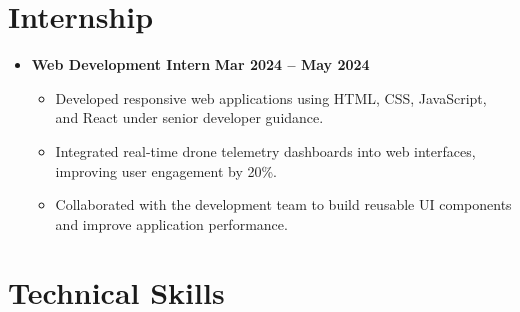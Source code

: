 \documentclass[letterpaper,11pt]{article}
\newcommand{\resumeItem}[1]{
\item\small{{#1 \vspace{-2pt}}}
}
\newcommand{\resumeSubHeadingListStart}{\begin{itemize}[leftmargin=0.0in,label={}]}
\newcommand{\resumeSubHeadingListEnd}{\end{itemize}}
\newcommand{\resumeItemListStart}{\begin{itemize}}
\newcommand{\resumeItemListEnd}{\end{itemize}\vspace{-5pt}}
\begin{document}
\section{Internship}

\resumeSubHeadingListStart

\item
\textbf{Web Development Intern}
\textbf{Mar 2024 -- May 2024}

\vspace{-8pt}

\resumeItemListStart

\resumeItem{Developed responsive web applications using HTML, CSS, JavaScript, and React under senior developer guidance.}

\resumeItem{Integrated real-time drone telemetry dashboards into web interfaces, improving user engagement by 20\%.}

\resumeItem{Collaborated with the development team to build reusable UI components and improve application performance.}

\resumeItemListEnd

\resumeSubHeadingListEnd


\section{Technical Skills}
\end{document}
